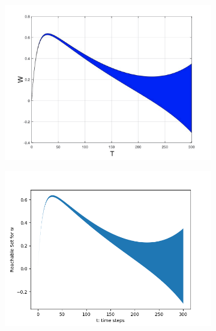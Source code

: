 \documentclass[EPiC]{easychair}
\begin{document}
\begin{figure}[h]
     \hspace{-12ex}
    \begin{subfigure}{0.6\textwidth}
    \centering
    \includegraphics[width=1.2\textwidth]{SapoFigures/Quad/SapoQuad_W.jpg}
    \end{subfigure}
    \hspace{5ex}
    \begin{subfigure}{0.6\textwidth}
    \centering
    \includegraphics[width=1.13\textwidth]{SapoFigures/Quad/KaaQuad_W.png}
    \end{subfigure}
    

\end{figure}
\end{document}
